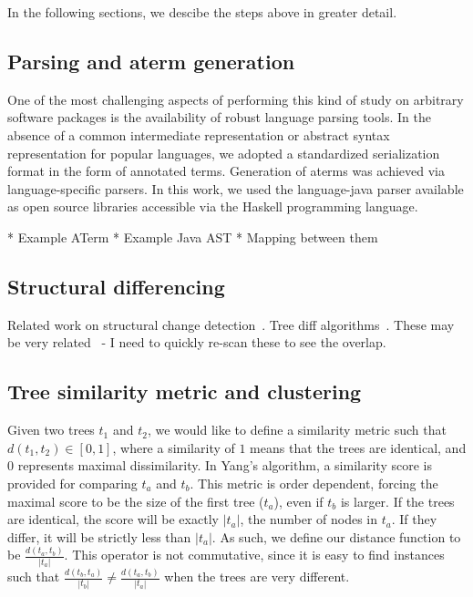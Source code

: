 \documentclass{acm_proc_article-sp}
\begin{document}
In the following sections, we descibe the steps above in greater detail.

\subsection{Parsing and aterm generation}

One of the most challenging aspects of performing this kind of study on
arbitrary software packages is the availability of robust language parsing
tools.  In the absence of a common intermediate representation or abstract
syntax representation for popular languages, we adopted a standardized
serialization format in the form of annotated terms.  Generation of aterms was
achieved via language-specific parsers.  In this work, we used the
language-java parser available as open source libraries accessible via the
Haskell programming language.

* Example ATerm
* Example Java AST
* Mapping between them

\subsection{Structural differencing}

Related work on structural change detection~\cite{chawathe96change}.  Tree
diff algorithms~\cite{tai79tree, selkow77tree}.  These may be very
related~\cite{weissgerber06identify, kim07automatic, neamtiu05understand} - I
need to quickly re-scan these to see the overlap.

\subsection{Tree similarity metric and clustering}

Given two trees $t_1$ and $t_2$, we would like to define a similarity metric
such that $d(t_1, t_2) \in [0,1]$, where a similarity of $1$ means that the
trees are identical, and $0$ represents maximal dissimilarity.  In Yang's
algorithm, a similarity score is provided for comparing $t_a$ and $t_b$. This
metric is order dependent, forcing the maximal score to be the size of the
first tree ($t_a$), even if $t_b$ is larger.  If the trees are identical, the
score will be exactly $|t_a|$, the number of nodes in $t_a$.  If they differ,
it will be strictly less than $|t_a|$.  As such, we define our distance
function to be $\frac{d(t_a, t_b)}{|t_a|}$.  This operator is not commutative,
since it is easy to find instances such that $\frac{d(t_b, t_a)}{|t_b|} \neq
\frac{d(t_a, t_b)}{|t_a|}$ when the trees are very different.
\end{document}
